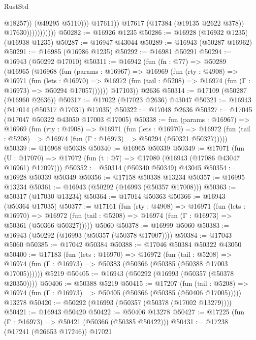 \begin{lexlean}{RustStd}
\begin{coremodule}
                                      @18257))
                                  (@49295 @5110)))
                              @17611))
                          @17617
                          (@17384 (@19135 @2622 @378))
                          @17630)))))))))))
@50282 := @16926 @1235
@50286 := @16928 (@16932 @1235) (@16938 @1235)
@50287 := @16947 @43044
@50289 := @16943 (@50287 @16962)
@50291 := @16985 (@16986 @1235)
@50292 := @16981 @50291
@50294 := @16943 (@50292 @17010)
@50311 := @16942
    (fun (fn : @77) =>
    @50289
      (@16965
        (@16968
          (fun (params : @16967) =>
          @16969
            (fun (rty : @4908) =>
            @16971
              (fun (lets : @16970) =>
              @16972 (fun (tail : @5208) => @16974 (fun (Γ : @16973) => @50294 @17057))))))
        @17103))
    @2636
@50314 := @17109 (@50287 (@16960 @2636))
@50317 := @17022 (@17023 @2636) @43047
@50321 := @16943 (@17014 (@50317 @17031) @17035)
@50322 := @17048 @2636
@50327 := @17045 (@17047 @50322 @43050 @17003 @17005)
@50338 := fun (params : @16967) =>
  @16969
    (fun (rty : @4908) =>
    @16971
      (fun (lets : @16970) =>
      @16972 (fun (tail : @5208) => @16974 (fun (Γ : @16973) => @50294 (@50321 @50327)))))
@50339 := @16968 @50338
@50340 := @16965 @50339
@50349 := @17071
    (fun (U : @17070) => @17072 (fun (t : @7) => @17080 (@16943 (@17086 @43047 @16961) @17097)))
@50352 := @50314 (@50340 @50349) @43045
@50354 := @16928 @50339 @50349
@50356 := @17158 @50338 @13234
@50357 := @16995 @13234
@50361 := @16943 (@50292 (@16993 (@50357 @17008)))
@50363 := @50317 (@17030 @13234)
@50364 := @17014 @50363
@50366 := @16943 (@50364 @17035)
@50377 := @17161
    (fun (rty : @4908) =>
    @16971
      (fun (lets : @16970) =>
      @16972 (fun (tail : @5208) => @16974 (fun (Γ : @16973) => @50361 (@50366 @50327)))))
    @5060
@50378 := @16999 @5060
@50383 := @16943 (@50292 (@16993 (@50357 (@50378 @17007))))
@50384 := @17043 @5060
@50385 := @17042 @50384
@50388 := @17046 @50384 @50322 @43050
@50400 := @17183
    (fun (lets : @16970) =>
    @16972
      (fun (tail : @5208) =>
      @16974 (fun (Γ : @16973) => @50383 (@50366 (@50385 (@50388 @17003 @17005))))))
    @5219
@50405 := @16943 (@50292 (@16993 (@50357 (@50378 @20350))))
@50406 := @50388 @5219
@50415 := @17207
    (fun (tail : @5208) => @16974 (fun (Γ : @16973) => @50405 (@50366 (@50385 (@50406 @17005)))))
    @13278
@50420 := @50292 (@16993 (@50357 (@50378 (@17002 @13279))))
@50421 := @16943 @50420
@50422 := @50406 @13278
@50427 := @17225 (fun (Γ : @16973) => @50421 (@50366 (@50385 @50422)))
@50431 := @17238 (@17241 (@26653 @17246)) @17021

\end{coremodule}
\end{lexlean}
